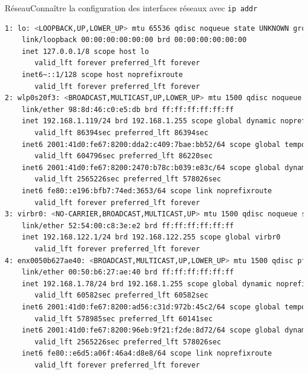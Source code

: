 \documentclass{beamer}
\begin{document}
    \begin{frame}[fragile]{Réseau}{Connaître la configuration des interfaces réseaux avec \lstinline{ip addr}}
        \begin{lstlisting}[language=bash,basicstyle=\tiny\ttfamily]
1: lo: <LOOPBACK,UP,LOWER_UP> mtu 65536 qdisc noqueue state UNKNOWN group default qlen 1000
    link/loopback 00:00:00:00:00:00 brd 00:00:00:00:00:00
    inet 127.0.0.1/8 scope host lo
       valid_lft forever preferred_lft forever
    inet6~::1/128 scope host noprefixroute
       valid_lft forever preferred_lft forever
2: wlp0s20f3: <BROADCAST,MULTICAST,UP,LOWER_UP> mtu 1500 qdisc noqueue state UP group default qlen 1000
    link/ether 98:8d:46:c0:e5:db brd ff:ff:ff:ff:ff:ff
    inet 192.168.1.119/24 brd 192.168.1.255 scope global dynamic noprefixroute wlp0s20f3
       valid_lft 86394sec preferred_lft 86394sec
    inet6 2001:41d0:fe67:8200:dda2:c409:7bae:bb52/64 scope global temporary dynamic
       valid_lft 604796sec preferred_lft 86220sec
    inet6 2001:41d0:fe67:8200:2470:b78c:b039:e83c/64 scope global dynamic mngtmpaddr noprefixroute
       valid_lft 2565226sec preferred_lft 578026sec
    inet6 fe80::e196:bfb7:74ed:3653/64 scope link noprefixroute
       valid_lft forever preferred_lft forever
3: virbr0: <NO-CARRIER,BROADCAST,MULTICAST,UP> mtu 1500 qdisc noqueue state DOWN group default qlen 1000
    link/ether 52:54:00:c8:3e:e2 brd ff:ff:ff:ff:ff:ff
    inet 192.168.122.1/24 brd 192.168.122.255 scope global virbr0
       valid_lft forever preferred_lft forever
4: enx0050b627ae40: <BROADCAST,MULTICAST,UP,LOWER_UP> mtu 1500 qdisc pfifo_fast state UP group default qlen 1000
    link/ether 00:50:b6:27:ae:40 brd ff:ff:ff:ff:ff:ff
    inet 192.168.1.78/24 brd 192.168.1.255 scope global dynamic noprefixroute enx0050b627ae40
       valid_lft 60582sec preferred_lft 60582sec
    inet6 2001:41d0:fe67:8200:ad56:c31d:972b:45c2/64 scope global temporary dynamic
       valid_lft 578985sec preferred_lft 60141sec
    inet6 2001:41d0:fe67:8200:96eb:9f21:f2de:8d72/64 scope global dynamic mngtmpaddr noprefixroute
       valid_lft 2565226sec preferred_lft 578026sec
    inet6 fe80::e6d5:a06f:46a4:d8e8/64 scope link noprefixroute
       valid_lft forever preferred_lft forever
        \end{lstlisting}
    \end{frame}
\end{document}
